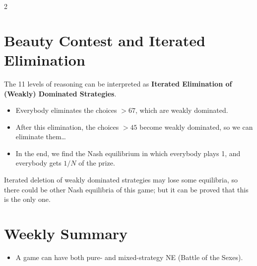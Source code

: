 \documentclass[a4paper,9pt]{extarticle}
\begin{document}
\begin{multicols}{2}
\begin{example}
\begin{itemize}
\end{itemize}

\end{example}



\section{Beauty Contest and Iterated Elimination}


\begin{important}

The 11 levels of reasoning can be interpreted as \textbf{Iterated Elimination of (Weakly)
Dominated Strategies}.

\begin{itemize}

\item Everybody eliminates the choices $> 67$, which are weakly dominated.

\item After this elimination, the choices $> 45$ become weakly dominated, so we can
eliminate them\dots

\item In the end, we find the Nash equilibrium in which everybody plays 1, and everybody
gets $1/N$ of the prize.

\end{itemize}

\end{important}


\begin{warning}

Iterated deletion of weakly dominated strategies may lose some equilibria, so there could be
other Nash equilibria of this game; but it can be proved that this is the only one.

\end{warning}



\section{Weekly Summary}


\begin{summary}

\begin{itemize}

\item A game can have both pure- and mixed-strategy NE (Battle of the Sexes).


\end{itemize}
\end{summary}
\end{multicols}
\end{document}
